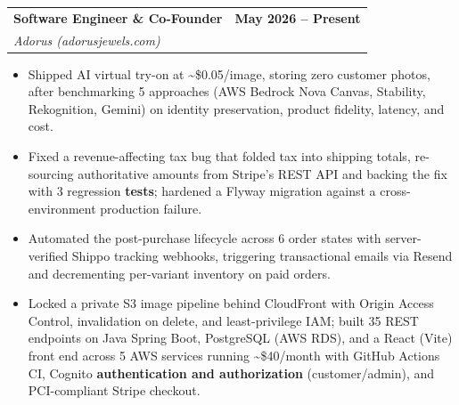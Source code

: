 \documentclass[letterpaper,10pt]{article}
\makeatletter
\newcommand{\nk}{\kern0pt}
\newcommand{\resumeItem}[1]{
  \item\small{
    {#1 \vspace{-3pt}}
  }
}
\newcommand{\resumeSubheading}[4]{
  \vspace{-2pt}\item
    \begin{tabular*}{0.97\textwidth}[t]{l@{\extracolsep{\fill}}r}
      \textbf{#1} & \textbf{#2} \\   %
      \textit{\small#3} & \textit{\small #4} \\
    \end{tabular*}\vspace{-7pt}
}
\newcommand{\resumeItemListStart}{\begin{itemize}}
\newcommand{\resumeItemListEnd}{\end{itemize}\vspace{-7pt}}
\makeatother
\begin{document}
    \resumeSubheading
      {Software Engineer \& Co-\nk Founder}{May 2026 -- Present}
      {Adorus (adorusjewels.com)}{}
      \resumeItemListStart
        \resumeItem{Shipped AI virtual try-on at \textasciitilde\$0.05/image, storing zero customer photos, after benchmarking 5 approaches (A\nk WS Bedrock Nova Canvas, Stability, Rekognition, Gemini) on identity preservation, product fidelity, latency, and cost.}
        \resumeItem{Fixed a revenue-affecting tax bug that folded tax into shipping totals, re-sourcing authoritative amounts from Stripe's REST API and backing the fix with 3 regression \textbf{tests}; hardened a Flyway migration against a cross-environment production failure.}
        \resumeItem{Automated the post-purchase lifecycle across 6 order states with server-verified Shippo tracking webhooks, triggering transactional emails via Resend and decrementing per-variant inventory on paid orders.}
        \resumeItem{Locked a private S3 image pipeline behind CloudFront with Origin Access Control, invalidation on delete, and least-privilege IAM; built 35 REST endpoints on Java Spring Boot, PostgreSQL (A\nk WS RDS), and a React (Vite) front end across 5 A\nk WS services running \textasciitilde\$40/month with GitHub Actions CI, Cognito \textbf{authentication and authorization} (customer/admin), and PCI-compliant Stripe checkout.}
      \resumeItemListEnd
\end{document}
